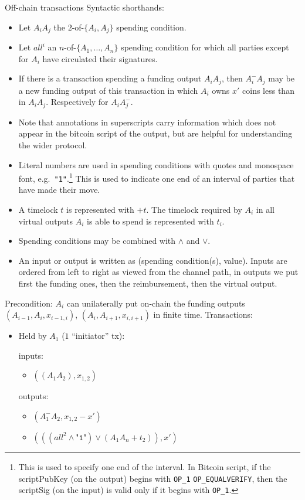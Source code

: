 \begin{notitlebox}{Off-chain transactions}
  Syntactic shorthands:
  \begin{itemize}
    \item Let $A_i A_j$ the $2$-of-$\{A_i, A_j\}$ spending condition.
    \item Let $\mathit{all}^i$ an $n$-of-$\{A_1, \dots, A_n\}$ spending
    condition for which all parties except for $A_i$ have circulated their
    signatures.
    \item If there is a transaction spending a funding output $A_i A_j$, then
    $A_i^{-} A_j$ may be a new funding output of this transaction in which $A_i$
    owns $x'$ coins less than in $A_i A_j$. Respectively for $A_i A_j^{-}$.
    \item Note that annotations in superscripts carry information which does
    not appear in the bitcoin script of the output, but are helpful for
    understanding the wider protocol.
    \item Literal numbers are used in spending conditions with quotes and
    monospace font, e.g.\ \texttt{"1"}.\footnote{This is used to specify one end
    of the interval. In Bitcoin script, if the scriptPubKey (on the output)
    begins with \texttt{OP\_1} \texttt{OP\_EQUALVERIFY}, then the scriptSig (on
    the input) is valid only if it begins with \texttt{OP\_1}.} This is used to
    indicate one end of an interval of parties that have made their move.
    \item A timelock $t$ is represented with $+t$. The timelock required by
    $A_i$ in all virtual outputs $A_i$ is able to spend is represented with
    $t_i$.
    \item Spending conditions may be combined with $\wedge$ and $\vee$.
    \item An input or output is written as (spending condition(s), value).
    Inputs are ordered from left to right as viewed from the channel path, in
    outputs we put first the funding ones, then the reimbursement, then the
    virtual output.
  \end{itemize}
  Precondition: $A_i$ can unilaterally put on-chain the funding outputs
  $(A_{i-1}, A_i, x_{i-1, i})$, $(A_i, A_{i+1}, x_{i, i+1})$ in finite time.
  Transactions:
  \begin{itemize}
    \item Held by $A_1$ ($1$ ``initiator'' tx):

    inputs:
    \begin{itemize}
      \item $((A_1 A_2), x_{1,2})$
    \end{itemize}
    outputs:
    \begin{itemize}
      \item $(A_1^- A_2, x_{1,2} - x')$
      \item $(((\mathit{all}^2 \wedge \texttt{"1"}) \vee (A_1 A_n + t_2)), x')$
    \end{itemize}


\end{itemize}
\end{notitlebox}
